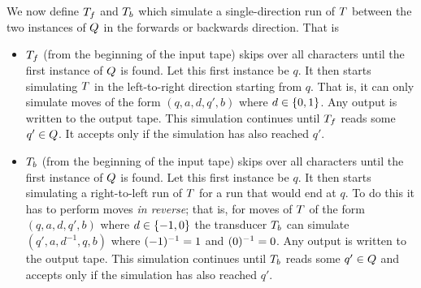 We now define $T_f$ and $T_b$ which simulate a
single-direction run of $T$ between the two instances of $Q$
in the forwards or backwards direction.
%
That is
\begin{itemize}
\item
    $T_f$ (from the beginning of the input tape) skips over all
    characters until the first instance of $Q$ is found.
    Let this first instance be $q$.
    It then starts simulating $T$ in the left-to-right direction
    starting from $q$.
    That is, it can only simulate moves of the form
    $(q, a, d, q', b)$
    where
    $d \in \{0, 1\}$.
    Any output is written to the output tape.
    This simulation continues until $T_f$ reads some
    $q' \in Q$.
    It accepts only if the simulation has also reached $q'$.

\item
    $T_b$ (from the beginning of the input tape) skips over all
    characters until the first instance of $Q$ is found.
    Let this first instance be $q$.
    It then starts simulating a right-to-left run of $T$ for a run
    that would end at $q$.
    To do this it has to perform moves \emph{in reverse};
    that is, for moves of $T$ of the form
    $(q, a, d, q', b)$
    where
    $d \in \{-1, 0\}$
    the transducer $T_b$ can simulate
    $(q', a, d^{-1}, q, b)$
    where
        $(-1)^{-1} = 1$
        and
        $(0)^{-1} = 0$.
    Any output is written to the output tape.
    This simulation continues until $T_b$ reads some
    $q' \in Q$
    and accepts only if the simulation has also reached $q'$.
\end{itemize}

